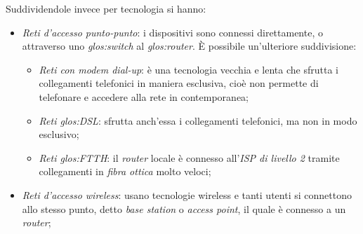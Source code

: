 \noindent
Suddividendole invece per tecnologia si hanno:
\begin{itemize}
    \item \emph{Reti d'accesso punto-punto}: i dispositivi sono connessi
    direttamente, o attraverso uno \emph{\gls{glos:switch}} al 
    \emph{\gls{glos:router}}. È possibile un'ulteriore suddivisione:
    \begin{itemize}
        \item \emph{Reti con modem dial-up}: è una tecnologia vecchia e lenta
        che sfrutta i collegamenti telefonici in maniera esclusiva, cioè non
        permette di telefonare e accedere alla rete in contemporanea;
        \item \emph{Reti \gls{glos:DSL}}: sfrutta anch'essa i collegamenti
        telefonici, ma non in modo esclusivo;
        \item \emph{Reti \gls{glos:FTTH}}: il \emph{router} locale è connesso
        all'\emph{ISP di livello 2} tramite collegamenti in \emph{fibra ottica}
        molto veloci;
    \end{itemize}
    \item \emph{Reti d'accesso wireless}: usano tecnologie wireless e tanti utenti
    si connettono allo stesso punto, detto \emph{base station} o \emph{access point},
    il quale è connesso a un \emph{router};
\end{itemize}

